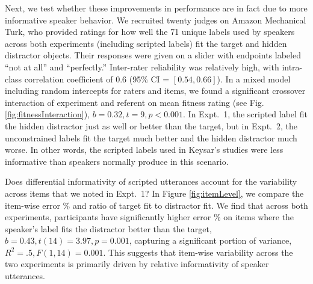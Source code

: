 \documentclass[manuscript]{stjour}
\begin{document}

Next, we test whether these improvements in performance are in fact due to more informative speaker behavior. We recruited twenty judges on Amazon Mechanical Turk, who provided ratings for how well the 71 unique labels used by speakers across both experiments (including scripted labels) fit the target and hidden distractor objects. Their responses were given on a slider with endpoints labeled ``not at all'' and ``perfectly.''  Inter-rater reliability was relatively high, with intra-class correlation coefficient of $0.6$ (95\% CI = $[0.54, 0.66]$). In a mixed model including random intercepts for raters and items, we found a significant crossover interaction of experiment and referent on mean fitness rating (see Fig. \ref{fig:fitnessInteraction}), $b = 0.32, t = 9, p < 0.001$. In Expt.~1, the scripted label fit the hidden distractor just as well or better than the target, but in Expt.~2, the unconstrained labels fit the target much better and the hidden distractor much worse. In other words, the scripted labels used in Keysar's studies were less informative than speakers normally produce in this scenario.

Does differential informativity of scripted utterances account for the variability across items that we noted in Expt.~1? In Figure \ref{fig:itemLevel}, we compare the item-wise error \% and ratio of target fit to distractor fit. We find that across both experiments, participants have significantly higher error \% on items where the speaker's label fits the distractor better than the target, $b = 0.43, t(14) = 3.97, p = 0.001$, capturing a significant portion of variance, $R^2 = .5, F(1,14) = 0.001$. This suggests that item-wise variability across the two experiments is primarily driven by relative informativity of speaker utterances. 
\end{document}
